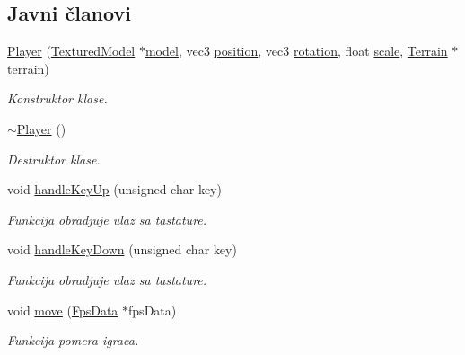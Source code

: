 \subsection*{Javni članovi}
\begin{DoxyCompactItemize}
\item 
\hyperlink{classentity_1_1Player_a0edc8eeed60bf40c1ec63bb4f56a89ff}{Player} (\hyperlink{classmodel_1_1TexturedModel}{Textured\+Model} $\ast$\hyperlink{classentity_1_1Entity_ac7848c5d47d4b2bf12c84ddbbc32052a}{model}, vec3 \hyperlink{classentity_1_1Entity_ad409c7f2085024479b276c2b6948bddb}{position}, vec3 \hyperlink{classentity_1_1Entity_aedb4c5dc1cfbc8cb3f6deb565ea920cb}{rotation}, float \hyperlink{classentity_1_1Entity_a59e5d5e3575df70cd5c74b5d739d84ca}{scale}, \hyperlink{classterrain_1_1Terrain}{Terrain} $\ast$\hyperlink{classentity_1_1Player_adc298ca7a3d8ab3528440489ed4ea60e}{terrain})
\begin{DoxyCompactList}\small\item\em Konstruktor klase. \end{DoxyCompactList}\item 
\hyperlink{classentity_1_1Player_aba0d4255d0d8624d01067418279bc9a1}{$\sim$\+Player} ()
\begin{DoxyCompactList}\small\item\em Destruktor klase. \end{DoxyCompactList}\item 
void \hyperlink{classentity_1_1Player_a27a2007873610439598c0ac07a91f3ac}{handle\+Key\+Up} (unsigned char key)
\begin{DoxyCompactList}\small\item\em Funkcija obradjuje ulaz sa tastature. \end{DoxyCompactList}\item 
void \hyperlink{classentity_1_1Player_af3d0b548d6daeb37d03f9fa57fb28f8a}{handle\+Key\+Down} (unsigned char key)
\begin{DoxyCompactList}\small\item\em Funkcija obradjuje ulaz sa tastature. \end{DoxyCompactList}\item 
void \hyperlink{classentity_1_1Player_ac4d89fa34bbc7a1a1db01db45e2da60f}{move} (\hyperlink{classutility_1_1FpsData}{Fps\+Data} $\ast$fps\+Data)
\begin{DoxyCompactList}\small\item\em Funkcija pomera igraca. \end{DoxyCompactList}\end{DoxyCompactItemize}
